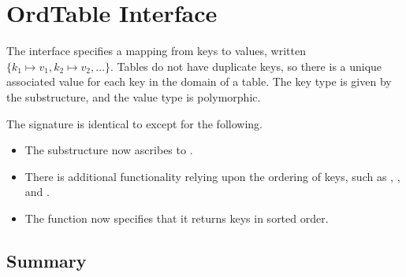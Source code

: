 \chapter{OrdTable Interface}
\label{ch:ordtable-interface}

\begin{cluster}
\label{grp:grm:ordtable-interface::ordtable}

\begin{gram}
\label{grm:ordtable-interface::ordtable}
\label{ch:ordtable-interface}
\begin{preamble}
The  interface specifies a mapping from keys to values, written
$\{k_1 \mapsto v_1, k_2 \mapsto v_2, \ldots\}$. Tables do not have duplicate
keys, so there is a unique associated value for each key in the domain of
a table. The key type is given by the  substructure, and the value
type is polymorphic.
\end{preamble}

\end{gram}
\end{cluster}

\begin{cluster}
\label{grp:nt:ordtable-interface::ordtable}

\begin{note}
\label{nt:ordtable-interface::ordtable}
The  signature is identical to  except for the following.
\begin{itemize}
  \item The  substructure now ascribes to .
  \item There is additional functionality relying upon the ordering of keys,
  such as , , and .
  \item The  function now specifies that it returns keys in sorted order.
\end{itemize}

\end{note}
\end{cluster}


\section{Summary}
\label{sec:ordtable-interface::summary}

